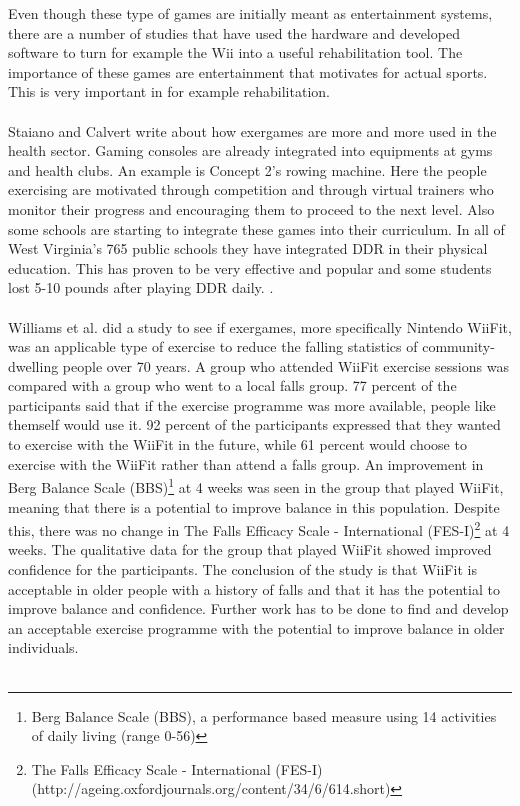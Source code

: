 Even though these type of games are initially meant as entertainment systems, there are a number of studies that have used the hardware and developed software to turn for example the Wii into a useful rehabilitation tool. The importance of these games are entertainment that motivates for actual sports. This is very important in for example rehabilitation. \cite{taylor2011activity} \\ \\
Staiano and Calvert write about how exergames are more and more used in the health sector. Gaming consoles are already integrated into equipments at gyms and health clubs. An example is Concept 2’s rowing machine. Here the people exercising are motivated through competition and through virtual trainers who monitor their progress and encouraging them to proceed to the next level. Also some schools are starting to integrate these games into their curriculum. In all of West Virginia’s 765 public schools they have integrated DDR in their physical education. This has proven to be very effective and popular and some students lost 5-10 pounds after playing DDR daily. \cite{staiano2011exergames}. \\ \\
Williams et al. did a study to see if exergames, more specifically Nintendo WiiFit, was an applicable type of exercise to reduce the falling statistics of community-dwelling people over 70 years. A group who attended WiiFit exercise sessions was compared with a group who went to a local falls group. 77 percent of the participants said that if the exercise programme was more available, people like themself would use it. 92 percent of the participants expressed that they wanted to exercise with the WiiFit in the future, while 61 percent would choose to exercise with the WiiFit rather than attend a falls group. An improvement in Berg Balance Scale (BBS)\footnote{Berg Balance Scale (BBS), a performance based measure using 14 activities of daily living (range 0-56)\cite{excell}} at 4 weeks was seen in the group that played WiiFit, meaning that there is a potential to improve balance in this population. Despite this, there was no change in The Falls Efficacy Scale - International (FES-I)\footnote{The Falls Efficacy Scale - International (FES-I) (http://ageing.oxfordjournals.org/content/34/6/614.short)} at 4 weeks. The qualitative data for the group that played WiiFit showed improved confidence for the participants. The conclusion of the study is that WiiFit is acceptable in  older people with a history of falls and that it has the potential to improve balance and confidence. Further work has to be done to find and develop an acceptable exercise programme with the potential to improve balance in older individuals. \cite{excell}\\ \\
